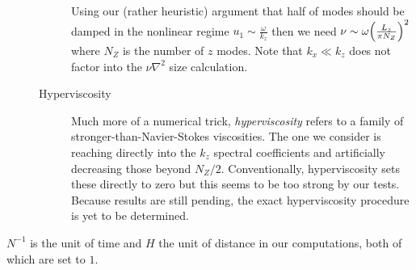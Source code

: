 \documentclass[11pt,
        usenames, %
        dvipsnames %
    ]{article}
\DeclarePairedDelimiter\p{\lparen}{\rparen}
\begin{document}
\begin{description}
\begin{description}
                Using our (rather heuristic) argument that half of modes should
                be damped in the nonlinear regime $u_1 \sim \frac{\omega}{k_z}$
                then we need $\nu \sim \omega \p*{\frac{L_z}{\pi N_Z}}^2$ where
                $N_Z$ is the number of $z$ modes. Note that $k_x\ll k_z$ does
                not factor into the $\nu \nabla^2$ size calculation.

            \item[Hyperviscosity] Much more of a numerical trick,
                \emph{hyperviscosity} refers to a family of
                stronger-than-Navier-Stokes viscosities. The one we consider is
                reaching directly into the $k_z$ spectral coefficients and
                artificially decreasing those beyond $N_Z/2$. Conventionally,
                hyperviscosity sets these directly to zero but this seems to be
                too strong by our tests. Because results are still pending, the
                exact hyperviscosity procedure is yet to be determined.
        \end{description}
\end{description}
$N^{-1}$ is the unit of time and $H$ the unit of distance in our computations,
both of which are set to $1$.

\clearpage

\renewcommand{\bibname}{References}
{\scriptsize }
\end{document}
